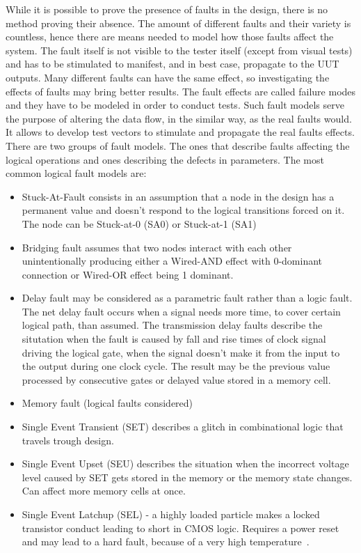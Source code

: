 While it is possible to prove the presence of faults in the design, there is no method proving their absence. The amount of different faults and their variety is countless, hence there are means needed to model how those faults affect the system. The fault itself is not visible to the tester itself (except from visual tests) and has to be stimulated to manifest, and in best case, propagate to the UUT outputs. Many different faults can have the same effect, so investigating the effects of faults may bring better results. The fault effects are called failure modes and they have to be modeled in order to conduct tests. Such fault models serve the purpose of altering the data flow, in the similar way, as the real faults would. It allows to develop test vectors to stimulate and propagate the real faults effects. There are two groups of fault models. The ones that describe faults affecting the logical operations and ones describing the defects in parameters. The most common logical fault models are:
\begin{itemize}
    \item Stuck-At-Fault consists in an assumption that a node in the design has a permanent value and doesn't respond to the logical transitions forced on it. The node can be Stuck-at-0 (SA0) or Stuck-at-1 (SA1)
    \item Bridging fault assumes that two nodes interact with each other unintentionally producing either a Wired-AND effect with 0-dominant connection or Wired-OR effect being 1 dominant.
    \item Delay fault may be considered as a parametric fault rather than a logic fault. The net delay fault occurs when a signal needs more time, to cover certain logical path, than assumed. The transmission delay faults describe the situtation when the fault is caused by fall and rise times of clock signal driving the logical gate, when the signal doesn't make it from the input to the output during one clock cycle. The result may be the previous value processed by consecutive gates or delayed value stored in a memory cell.
    \item Memory fault (logical faults considered)
    \item Single Event Transient (SET) describes a glitch in combinational logic that travels trough design.
    \item Single Event Upset (SEU) describes the situation when the incorrect voltage level caused by SET gets stored in the memory or the memory state changes. Can affect more memory cells at once.
    \item Single Event Latchup (SEL) - a highly loaded particle makes a locked transistor conduct leading to short in CMOS logic. Requires a power reset and may lead to a hard fault, because of a very high temperature~\cite{report:altera}.
\end{itemize}
